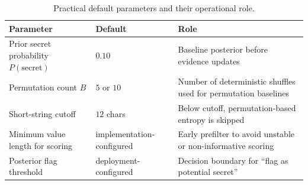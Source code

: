 \documentclass[10pt]{article}
\begin{document}
\begin{table}[ht]
\centering
\begin{tabular}{|>{\raggedright\arraybackslash}p{4.1cm}|>{\raggedright\arraybackslash}p{2.3cm}|>{\raggedright\arraybackslash}p{6.3cm}|}
\hline
\textbf{Parameter} & \textbf{Default} & \textbf{Role} \\
\hline
Prior secret probability $P(\text{secret})$ & $0.10$ & Baseline posterior before evidence updates \\
\hline
Permutation count $B$ & $5$ or $10$ & Number of deterministic shuffles used for permutation baselines \\
\hline
Short-string cutoff & $12$ chars & Below cutoff, permutation-based entropy is skipped \\
\hline
Minimum value length for scoring & implementation-configured & Early prefilter to avoid unstable or non-informative scoring \\
\hline
Posterior flag threshold & deployment-configured & Decision boundary for ``flag as potential secret'' \\
\hline
\end{tabular}
\caption{Practical default parameters and their operational role.}
\label{tab:defaults}
\end{table}
\end{document}
